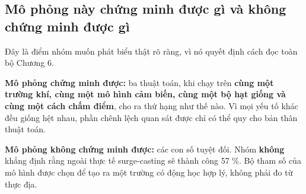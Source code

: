 \subsection{Mô phỏng này chứng minh được gì và không chứng minh được gì}
Đây là điểm nhóm muốn phát biểu thật rõ ràng, vì nó quyết định cách đọc toàn bộ Chương 6.

\textbf{Mô phỏng chứng minh được:} ba thuật toán, khi chạy trên \textbf{cùng một trường khí, cùng một mô hình cảm biến, cùng một bộ hạt giống và cùng một cách chấm điểm}, cho ra thứ hạng như thế nào. Vì mọi yếu tố khác đều giống hệt nhau, phần chênh lệch quan sát được chỉ có thể quy cho bản thân thuật toán.

\textbf{Mô phỏng không chứng minh được:} các con số tuyệt đối. Nhóm \textbf{không} khẳng định rằng ngoài thực tế surge-casting sẽ thành công 57 \%. Bộ tham số của mô hình được chọn để tạo ra một trường có động học hợp lý, không phải đo từ thực địa.
